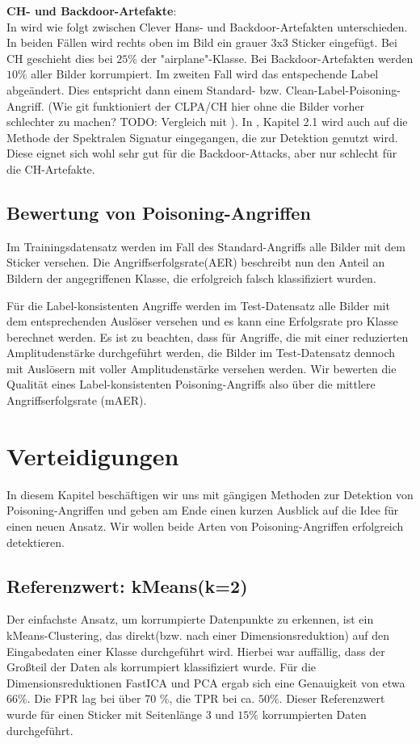 \documentclass[11pt,a4paper]{article}
\numberwithin{equation}{section}
\begin{document}
	\noindent \textbf{CH- und Backdoor-Artefakte}:\\
	In \cite{imagenet_unhansed_v2} wird wie folgt zwischen Clever Hans- und Backdoor-Artefakten unterschieden. In beiden Fällen wird rechts oben im Bild ein grauer 3x3 Sticker eingefügt.
	Bei CH geschieht dies bei $25 \%$ der "airplane"-Klasse. Bei Backdoor-Artefakten werden $10 \%$ aller Bilder korrumpiert. Im zweiten Fall wird das entspechende Label abgeändert. Dies entspricht dann einem Standard- bzw. Clean-Label-Poisoning-Angriff. (Wie git funktioniert der CLPA/CH hier ohne die Bilder vorher schlechter zu machen? TODO: Vergleich mit \cite{labelconsistent}). In \cite{imagenet_unhansed_v2}, Kapitel 2.1 wird auch auf die Methode der Spektralen Signatur \cite{spectral_signatures} eingegangen, die zur Detektion genutzt wird. Diese eignet sich wohl sehr gut für die Backdoor-Attacks, aber nur schlecht für die CH-Artefakte.
	
	\subsection{Bewertung von Poisoning-Angriffen}
	Im Trainingsdatensatz werden im Fall des Standard-Angriffs alle Bilder mit dem Sticker versehen. Die Angriffserfolgsrate(AER) beschreibt nun den Anteil an Bildern der angegriffenen Klasse, die erfolgreich falsch klassifiziert wurden.
	
	Für die Label-konsistenten Angriffe werden im Test-Datensatz alle Bilder mit dem entsprechenden Auslöser versehen und es kann eine Erfolgsrate pro Klasse berechnet werden. Es ist zu beachten, dass für Angriffe, die mit einer reduzierten Amplitudenstärke durchgeführt werden, die Bilder im Test-Datensatz dennoch mit Auslösern mit voller Amplitudenstärke versehen werden.
	Wir bewerten die Qualität eines Label-konsistenten Poisoning-Angriffs also über die mittlere Angriffserfolgsrate (mAER).
	
	\section{Verteidigungen}
	In diesem Kapitel beschäftigen wir uns mit gängigen Methoden zur Detektion von Poisoning-Angriffen und geben am Ende einen kurzen Ausblick auf die Idee für einen neuen Ansatz.
	Wir wollen beide Arten von Poisoning-Angriffen erfolgreich detektieren. 
	
	\subsection{Referenzwert: kMeans(k=2)}
	Der einfachste Ansatz, um korrumpierte Datenpunkte zu erkennen, ist ein kMeans-Clustering, das direkt(bzw. nach einer Dimensionsreduktion) auf den Eingabedaten einer Klasse durchgeführt wird. Hierbei war auffällig, dass der Großteil der Daten als korrumpiert klassifiziert wurde. Für die Dimensionsreduktionen FastICA und PCA ergab sich eine Genauigkeit von etwa $66 \%$. Die FPR lag bei über 70 \%, die TPR bei ca. $50 \%$.
	Dieser Referenzwert wurde für einen Sticker mit Seitenlänge 3 und $15 \%$ korrumpierten Daten durchgeführt.
\end{document}
